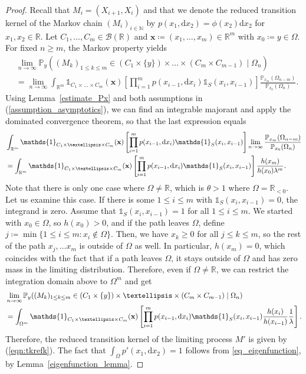 \documentclass[10pt,a4paper]{amsart}
\newcommand{\N}{\mathbb{N}} %
\newcommand{\R}{\mathbb{R}} %
\renewcommand{\P}{\mathbb{P}} %
\newcommand{\1}{\mathds{1}}
\renewcommand{\d}{\mathrm{d}}
\begin{document}
\begin{proof} Recall that $M_i=(X_{i+1},X_i)$ and that we denote the reduced transition kernel of the Markov chain $(M_i)_{i\in\N}$ by $p(x_1,\d x_2)=\phi(x_2)\d x_2$ for $x_1, x_2\in\R$. Let $C_1,\dots, C_m\in\mathcal{B}(\R)$ and $\mathbf{x}\coloneqq(x_1,\dots,x_m)\in \R^m$ with $x_0\coloneqq y\in\Omega$. For fixed $n\ge m$, the Markov property yields
\begin{align*}
     &\lim_{n\to\infty}\P_{y}((M_k)_{1\leq k\leq m}\in (C_1\times\{y\})\times\dots\times (C_m\times C_{m-1})\mid \Omega_n)   \\&=\lim_{n\to\infty}\int_{\R^m}\1_{C_1\times\dots\times C_m}(\mathbf{x})\left[\prod_{i=1}^m p(x_{i-1},\d x_i)\mathds{1}_S(x_i,x_{i-1})\right]\frac{\P_{x_m}(\Omega_{n-m})}{\P_{x_0}(\Omega_n)} .
\end{align*}
Using Lemma~\ref{estimate_Px} and both assumptions in (\ref{assumption_asymptotics}), we can find an integrable majorant and apply the dominated convergence theorem, so that the last expression equals
\begin{align}
    &
    \int_{\R^m}\1_{C_1\times\dots\times C_m}(\mathbf{x})\left[\prod_{i=1}^m p(x_{i-1},\d x_i)\mathds{1}_S(x_i,x_{i-1})\right]\lim_{n\to\infty}\frac{\P_{x_m}(\Omega_{n-m})}{\P_{x_0}(\Omega_n)}  \notag
    \\&=\int_{\R^m}\1_{C_1\times\dots\times C_m}(\mathbf{x})\left[\prod_{i=1}^m p(x_{i-1},\d x_i)\mathds{1}_S(x_i,x_{i-1})\right]\frac{h(x_m)}{h(x_0)\lambda^m}.\notag
\end{align}
Note that there is only one case where $\Omega\ne \R$, which is $\theta>1$ where $\Omega=\R_{<0}$. Let us examine this case. If there is some $1\le i\le m$ with  $\mathds{1}_S(x_i,x_{i-1})=0$, the integrand is zero. Assume that $\mathds{1}_S(x_i,x_{i-1})=1$ for all $1\le i\le m$. We started with $x_0\in\Omega$, so $h(x_0)>0$, and if the path leaves $\Omega$, define $j\coloneqq\min\{1\leq i\leq m:x_i\notin\Omega\}$. Then, we have $x_{k}\ge0$ for all $j\le k\le m$, so the rest of the path $x_{j},\dots x_m$ is outside of $\Omega$ as well. In particular, $h(x_m)=0$, which coincides with the fact that if a path leaves $\Omega$, it stays outside of $\Omega$ and has zero mass in the limiting distribution. Therefore, even if $\Omega\neq \R$, we can restrict the integration domain above to $\Omega^m$ and get
\begin{align}
    &\lim_{n\to\infty}\P_{y}((M_k)_{1\leq k\leq m}\in (C_1\times\{y\})\times\dots\times (C_m\times C_{m-1})\mid \Omega_n)\notag
    \\&=\int_{\Omega^m}\1_{C_1\times\dots\times C_m}(\mathbf{x})\left[\prod_{i=1}^m p(x_{i-1},\d x_i)\mathds{1}_S(x_i,x_{i-1})\frac{h(x_i)}{h(x_{i-1})}\frac{1}{\lambda}\right].\notag
\end{align}
Therefore, the reduced transition kernel of the limiting process $M'$ is given by (\ref{eqn:tkrefk}).
The fact that $\int_\Omega p'(x_1,\d x_2) =1$ follows from \eqref{eq_eigenfunction}, by Lemma~\ref{eigenfunction_lemma}.
\end{proof}
\end{document}
